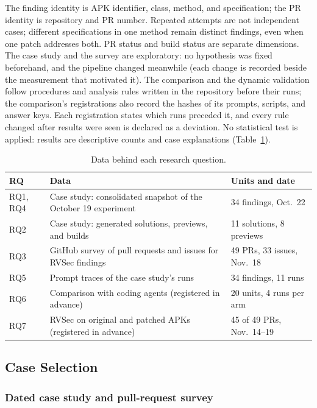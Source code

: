 \documentclass[conference]{IEEEtran}
\begin{document}
The finding identity is APK identifier, class, method, and specification; the
PR identity is repository and PR number. Repeated attempts are not independent
cases; different specifications in one method remain distinct findings, even
when one patch addresses both. PR status and build status are separate
dimensions. The case study and the survey are exploratory: no hypothesis was
fixed beforehand, and the pipeline changed meanwhile (each change is recorded
beside the measurement that motivated it). The comparison and the dynamic
validation follow procedures and analysis rules written in the repository
before their runs; the comparison's registrations also record the hashes of
its prompts, scripts, and answer keys. Each registration states which runs
preceded it, and every rule changed after results were seen is declared as a
deviation. No statistical test is applied: results are descriptive counts and
case explanations (Table~\ref{tab:rq-data}).

\begin{table}[H]
\centering
\caption{Data behind each research question.}
\label{tab:rq-data}
\footnotesize
\begin{tabular}{p{0.9cm}p{3.7cm}p{2.6cm}}
\toprule
RQ & Data & Units and date \\
\midrule
RQ1, RQ4 & Case study: consolidated snapshot of the October 19 experiment & 34 findings, Oct.~22 \\
RQ2 & Case study: generated solutions, previews, and builds & 11 solutions, 8 previews \\
RQ3 & GitHub survey of pull requests and issues for RVSec findings & 49 PRs, 33 issues, Nov.~18 \\
RQ5 & Prompt traces of the case study's runs & 34 findings, 11 runs \\
RQ6 & Comparison with coding agents (registered in advance) & 20 units, 4 runs per arm \\
RQ7 & RVSec on original and patched APKs (registered in advance) & 45 of 49 PRs, Nov.~14--19 \\
\bottomrule
\end{tabular}
\end{table}

\subsection{Case Selection}
\label{subsec:selection}

\subsubsection{Dated case study and pull-request survey}
\end{document}
